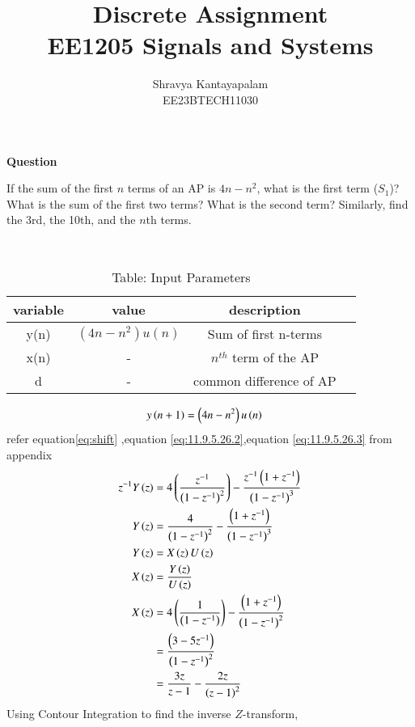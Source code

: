 \documentclass[a4,12pt,onecolumn]{IEEEtran}
\begin{document}
\title{
\Huge\textbf{ Discrete Assignment}\\
\Huge\textbf{EE1205} Signals and Systems\\
}
\author{Shravya Kantayapalam\\ EE23BTECH11030}
\maketitle
\textbf{Question} 

 If the sum of the first $ n $ terms of an AP is $4n - n^2$, what is the first term ($ S_1 $)? What is the sum of the first two terms? What is the second term? Similarly, find the 3rd, the 10th, and the $n$th terms.
 
\solution\\
\begin{table}[ht!]
\begin{center}
\begin{tabular}{|c|c|c|c|}
   \hline
   variable&value&description\\
   \hline 
   y(n)&$(4n-n^2)u(n)$& Sum of first n-terms\\
   \hline
   x(n)&-&$n^{th}$ term of the AP\\
   \hline 
   d&-&common difference of AP\\
   \hline
\end{tabular}
\caption{Table: Input Parameters}
\end{center}
\end{table}
\begin{align}
y\left(n+1\right)&=\left(4n-n^2\right)u\left(n\right)
\end{align}
refer equation\eqref{eq:shift} ,equation \eqref{eq:11.9.5.26.2},equation \eqref{eq:11.9.5.26.3} from appendix
\begin{align}
z^{-1}Y\left(z\right) &=4\left(\frac{z^{-1}}{\left(1-z^{-1}\right)^2}\right)-\frac{z^{-1}\left(1+z^{-1}\right)}{\left(1-z^{-1}\right)^3}\\
Y\left(z\right) &=\frac{4}{\left(1-z^{-1}\right)^2}-\frac{\left(1+z^{-1}\right)}{\left(1-z^{-1}\right)^3}\\
Y\left(z\right)&=X\left(z\right)U\left(z\right)\\
X\left(z\right)&=\frac{Y\left(z\right)}{U\left(z\right)}\\
X\left(z\right)&=4\left(\frac{1}{\left(1-z^{-1}\right)}\right)-\frac{\left(1+z^{-1}\right)}{\left(1-z^{-1}\right)^2}\\
&=\frac{\left(3-5z^{-1}\right)}{\left(1-z^{-1}\right)^2}\\
&=\frac{3z}{z-1}-\frac{2z}{\left(z-1\right)^2}
\end{align}
Using Contour Integration to find the inverse $Z$-transform,
\end{document}
